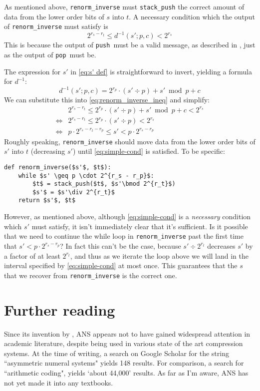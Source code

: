 \documentclass{article}
\newcommand{\push}{\texttt{push}}
\newcommand{\pop}{\texttt{pop}}
\begin{document}
As mentioned above, \texttt{renorm\_inverse} must \texttt{stack\_push} the
correct amount of data from the lower order bits of $s$ into $t$. A necessary
condition which the output of \texttt{renorm\_inverse} must satisfy is
\begin{equation}\label{eq:renorm_inverse_ineq}
  2^{r_s - r_t} \leq d^{-1}(s'; p, c) < 2^{r_s}
\end{equation}
This is because the output of \push\ must be a valid message, as described in
, just as the output of \pop\ must be.

The expression for $s'$ in \cref{eq:s' def} is straightforward to invert,
yielding a formula for
$d^{-1}$:
\begin{equation}
  d^{-1}(s'; p, c) = 2^{r_p} \cdot (s' \div p) + s' \bmod p + c
\end{equation}
We can substitute this into \cref{eq:renorm_inverse_ineq} and simplify:
\begin{align}
  &2^{r_s - r_t} \leq 2^{r_p} \cdot (s' \div p) + s' \bmod p + c < 2^{r_s}\\
  \iff&2^{r_s - r_t} \leq 2^{r_p} \cdot (s' \div p) < 2^{r_s}\\
  \iff&p\cdot2^{r_s - r_t - r_p}\leq s' < p\cdot 2^{r_s -
  r_p}\label{eq:simple-cond}
\end{align}
Roughly speaking, \texttt{renorm\_inverse} should move data from the lower
order bits of $s'$ into $t$ (decreasing $s'$) until \cref{eq:simple-cond} is
satisfied. To be specific:

\begin{lstlisting}
def renorm_inverse($s'$, $t$):
    while $s' \geq p \cdot 2^{r_s - r_p}$:
        $t$ = stack_push($t$, $s'\bmod 2^{r_t}$)
        $s'$ = $s'\div 2^{r_t}$
    return $s'$, $t$
\end{lstlisting}

However, as mentioned above, although \cref{eq:simple-cond} is a
\emph{necessary} condition which $s'$ must satisfy, it isn't immediately clear
that it's sufficient. Is it possible that we need to continue the while loop in
\texttt{renorm\_inverse} past the first time that $s'<p\cdot2^{r_s - r_p}$? In
fact this can't be the case, because $s'\div2^{r_t}$ decreases $s'$ by a factor
of at least $2^{r_t}$, and thus as we iterate the loop above we will land in
the interval specified by \cref{eq:simple-cond} at most once. This guarantees
that the $s$ that we recover from \texttt{renorm\_inverse} is the correct one.

\section{Further reading}
Since its invention by \cite{dudaAsymmetricNumeralSystems2009}, ANS appears not
to have gained widespread attention in academic literature, despite being used
in various state of the art compression systems. At the time of writing, a
search on Google Scholar for the string ``asymmetric numeral systems" yields
148 results. For comparison, a search for ``arithmetic coding", yields `about
44,000' results. As far as I'm aware, ANS has not yet made it into any
textbooks.
\end{document}
